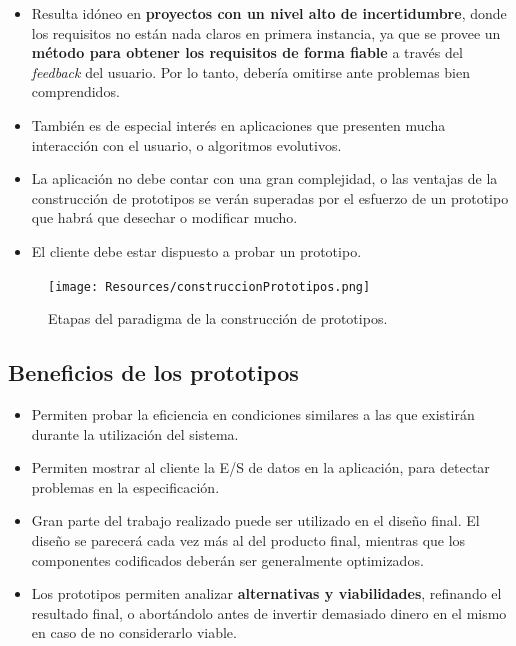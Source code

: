 \begin{itemize}
   \item Resulta idóneo en \textbf{proyectos con un nivel alto de incertidumbre}, donde los requisitos no están nada claros en primera instancia, ya que se provee un \textbf{método para obtener los requisitos de forma fiable} a través del \textit{feedback} del usuario. Por lo tanto, debería omitirse ante problemas bien comprendidos.
   \item También es de especial interés en aplicaciones que presenten mucha interacción con el usuario, o algoritmos evolutivos.
   \item La aplicación no debe contar con una gran complejidad, o las ventajas de la construcción de prototipos se verán superadas por el esfuerzo de un prototipo que habrá que desechar o modificar mucho.
   \item El cliente debe estar dispuesto a probar un prototipo.
\end{itemize}

\begin{figure}[H]
   \centering
   \texttt{[image: Resources/construccionPrototipos.png]}
   \caption{Etapas del paradigma de la construcción de prototipos.}
   \label{fig:construccionPrototipos}
\end{figure}

\subsection{Beneficios de los prototipos}

\begin{itemize}
   \item Permiten probar la eficiencia en condiciones similares a las que existirán durante la utilización del sistema.
   \item Permiten mostrar al cliente la E/S de datos en la aplicación, para detectar problemas en la especificación.
   \item Gran parte del trabajo realizado puede ser utilizado en el diseño final. El diseño se parecerá cada vez más al del producto final, mientras que los componentes codificados deberán ser generalmente optimizados.
   \item Los prototipos permiten analizar \textbf{alternativas y viabilidades}, refinando el resultado final, o abortándolo antes de invertir demasiado dinero en el mismo en caso de no considerarlo viable.
\end{itemize}

